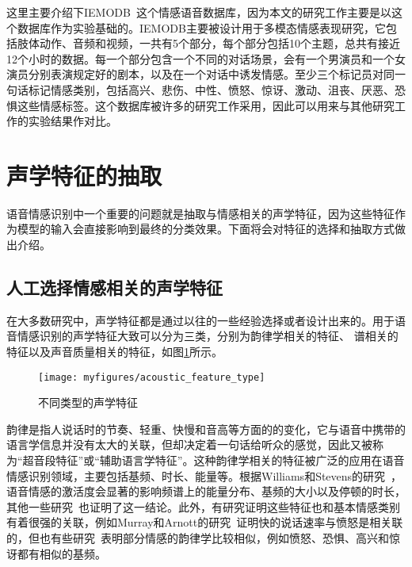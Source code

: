 
这里主要介绍下IEMODB~\cite{Busso2008IEMOCAP}这个情感语音数据库，因为本文的研究工作主要是以这个数据库作为实验基础的。IEMODB主要被设计用于多模态情感表现研究，它包括肢体动作、音频和视频，一共有5个部分，每个部分包括10个主题，总共有接近12个小时的数据。每一个部分包含一个不同的对话场景，会有一个男演员和一个女演员分别表演规定好的剧本，以及在一个对话中诱发情感。至少三个标记员对同一句话标记情感类别，包括高兴、悲伤、中性、愤怒、惊讶、激动、沮丧、厌恶、恐惧这些情感标签。这个数据库被许多的研究工作采用，因此可以用来与其他研究工作的实验结果作对比。

\section{声学特征的抽取}
\label{sec:acoustic_feature_extract}
语音情感识别中一个重要的问题就是抽取与情感相关的声学特征，因为这些特征作为模型的输入会直接影响到最终的分类效果。下面将会对特征的选择和抽取方式做出介绍。

\subsection{人工选择情感相关的声学特征}
\label{ssec:artifical_select}
在大多数研究中，声学特征都是通过以往的一些经验选择或者设计出来的。用于语音情感识别的声学特征大致可以分为三类，分别为韵律学相关的特征、  谱相关的特征以及声音质量相关的特征，如图\ref{fig:acoustic_feature_type}所示。

\begin{figure}[htb] %
    \centering
    \texttt{[image: myfigures/acoustic\_feature\_type]}
    \caption{不同类型的声学特征}
    \label{fig:acoustic_feature_type}
\end{figure}

韵律是指人说话时的节奏、轻重、快慢和音高等方面的的变化，它与语音中携带的语言学信息并没有太大的关联，但却决定着一句话给听众的感觉，因此又被称为“超音段特征”或“辅助语言学特征”。这种韵律学相关的特征被广泛的应用在语音情感识别领域，主要包括基频、时长、能量等。根据Williams和Stevens的研究~\cite{Williams1981Vocal}，语音情感的激活度会显著的影响频谱上的能量分布、基频的大小以及停顿的时长，其他一些研究~\cite{Johnstone2000Vocal, Cowie2003Describing}也证明了这一结论。此外，有研究证明这些特征也和基本情感类别有着很强的关联，例如Murray和Arnott的研究~\cite{Murray1993Toward}证明快的说话速率与愤怒是相关联的，但也有些研究~\cite{Ackroyd1997Digital, Cahn1990The}表明部分情感的韵律学比较相似，例如愤怒、恐惧、高兴和惊讶都有相似的基频。

